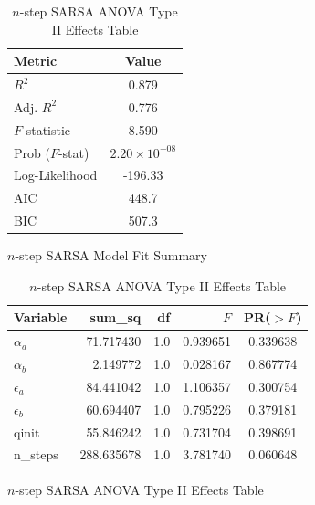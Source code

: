 \documentclass{article}
\begin{document}
\begin{table}[htbp]
    \centering
    
    \begin{subfigure}[b]{0.4\textwidth}
        \centering
        \caption{$n$-step SARSA Model Fit Summary}
        \label{tab:nstep_ols_summary}
        \begin{tabular}{lc}
            \toprule
            \textbf{Metric} & \textbf{Value} \\ 
            \midrule
            $R^2$ & 0.879 \\
            Adj. $R^2$ & 0.776 \\
            $F$-statistic & 8.590 \\
            Prob ($F$-stat) & $2.20 \times 10^{-08}$ \\
            Log-Likelihood & -196.33 \\
            AIC & 448.7 \\
            BIC & 507.3 \\ 
            \bottomrule
        \end{tabular}
    \end{subfigure}
    \hfill
    \begin{subfigure}[b]{0.58\textwidth}
        \centering
        \caption{$n$-step SARSA ANOVA Type II Effects Table}
        \label{tab:nstep_anova_results}
        \begin{tabular}{lrrrc}
            \toprule
            \textbf{Variable} & \textbf{sum\_sq} & \textbf{df} & \textbf{$F$} & \textbf{PR($>F$)} \\ 
            \midrule
            $\alpha_a$ & 71.717430 & 1.0 & 0.939651 & 0.339638 \\
            $\alpha_b$ & 2.149772 & 1.0 & 0.028167 & 0.867774 \\
            $\epsilon_a$ & 84.441042 & 1.0 & 1.106357 & 0.300754 \\
            $\epsilon_b$ & 60.694407 & 1.0 & 0.795226 & 0.379181 \\
            qinit & 55.846242 & 1.0 & 0.731704 & 0.398691 \\
            n\_steps & 288.635678 & 1.0 & 3.781740 & 0.060648 \\ 
            \bottomrule
        \end{tabular}
    \end{subfigure}
    
    
    \vspace{5mm} %
    

\end{table}
\end{document}
